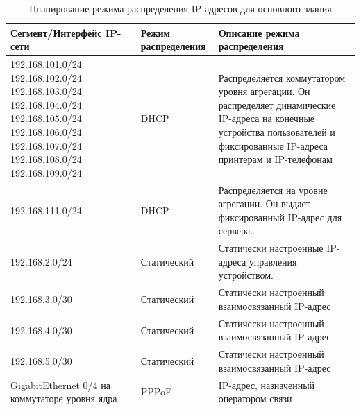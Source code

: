 \begin{table}[H]
\centering
{}
\caption{Планирование режима распределения IP-адресов для основного здания\label{table:ip_settings_oz}}
\small
\begin{tabularx}{\textwidth}{|X|X|X|}
    \hline
	Сегмент/Интерфейс IP-сети	&	Режим распределения		&	Описание режима распределения 	\\ 
	\hline
	192.168.101.0/24 
	192.168.102.0/24 
	192.168.103.0/24 
	192.168.104.0/24 
	192.168.105.0/24 
	192.168.106.0/24 
	192.168.107.0/24 
	192.168.108.0/24 
	192.168.109.0/24 &	DHCP & Распределяется коммутатором уровня агрегации. Он распределяет динамические IP-адреса  на конечные устройства пользователей и фиксированные IP-адреса принтерам и IP-телефонам \\ 
	\hline
	192.168.111.0/24 &	DHCP & Распределяется на уровне агрегации. Он выдает фиксированный IP-адрес для сервера. \\
	\hline
	192.168.2.0/24	& Статический & Статически настроенные IP-адреса управления устройством. \\
	\hline
	192.168.3.0/30 & Статический & Статически настроенный взаимосвязанный IP-адрес \\
	\hline
	192.168.4.0/30 & Статический & Статически настроенный взаимосвязанный IP-адрес \\
	\hline
	192.168.5.0/30 & Статический & Статически настроенный взаимосвязанный IP-адрес \\
	\hline
	GigabitEthernet 0/4 на коммутаторе уровня ядра & PPPoE & IP-адрес, назначенный оператором связи \\
	\hline
\end{tabularx}
\end{table}




